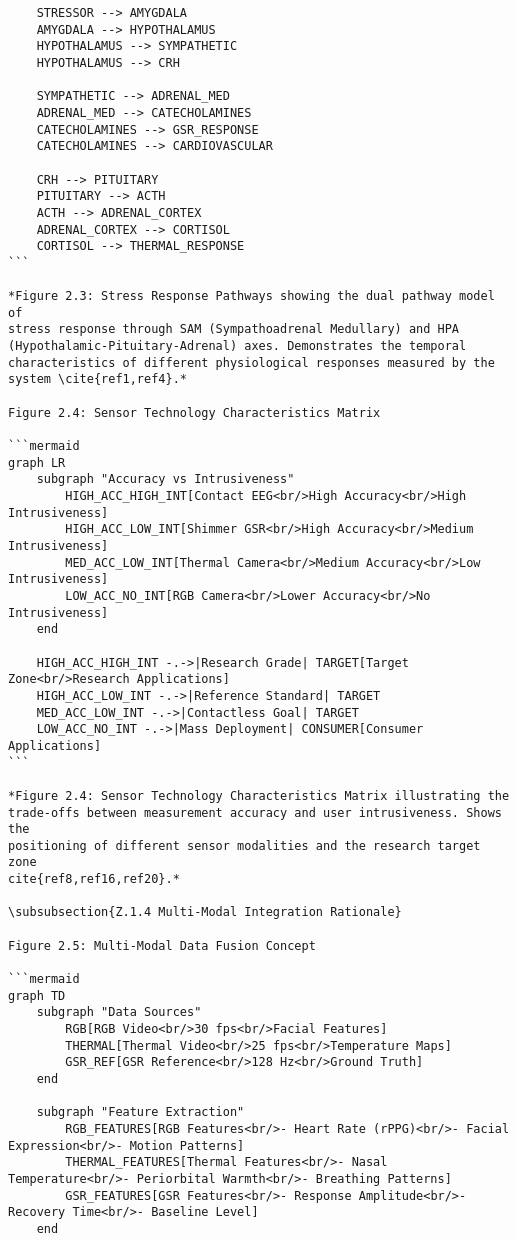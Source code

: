 \begin{verbatim}
    STRESSOR --> AMYGDALA
    AMYGDALA --> HYPOTHALAMUS
    HYPOTHALAMUS --> SYMPATHETIC
    HYPOTHALAMUS --> CRH

    SYMPATHETIC --> ADRENAL_MED
    ADRENAL_MED --> CATECHOLAMINES
    CATECHOLAMINES --> GSR_RESPONSE
    CATECHOLAMINES --> CARDIOVASCULAR

    CRH --> PITUITARY
    PITUITARY --> ACTH
    ACTH --> ADRENAL_CORTEX
    ADRENAL_CORTEX --> CORTISOL
    CORTISOL --> THERMAL_RESPONSE
```

*Figure 2.3: Stress Response Pathways showing the dual pathway model of
stress response through SAM (Sympathoadrenal Medullary) and HPA
(Hypothalamic-Pituitary-Adrenal) axes. Demonstrates the temporal
characteristics of different physiological responses measured by the
system \cite{ref1,ref4}.*

Figure 2.4: Sensor Technology Characteristics Matrix

```mermaid
graph LR
    subgraph "Accuracy vs Intrusiveness"
        HIGH_ACC_HIGH_INT[Contact EEG<br/>High Accuracy<br/>High Intrusiveness]
        HIGH_ACC_LOW_INT[Shimmer GSR<br/>High Accuracy<br/>Medium Intrusiveness]
        MED_ACC_LOW_INT[Thermal Camera<br/>Medium Accuracy<br/>Low Intrusiveness]
        LOW_ACC_NO_INT[RGB Camera<br/>Lower Accuracy<br/>No Intrusiveness]
    end

    HIGH_ACC_HIGH_INT -.->|Research Grade| TARGET[Target Zone<br/>Research Applications]
    HIGH_ACC_LOW_INT -.->|Reference Standard| TARGET
    MED_ACC_LOW_INT -.->|Contactless Goal| TARGET
    LOW_ACC_NO_INT -.->|Mass Deployment| CONSUMER[Consumer Applications]
```

*Figure 2.4: Sensor Technology Characteristics Matrix illustrating the
trade-offs between measurement accuracy and user intrusiveness. Shows the
positioning of different sensor modalities and the research target zone
cite{ref8,ref16,ref20}.*

\subsubsection{Z.1.4 Multi-Modal Integration Rationale}

Figure 2.5: Multi-Modal Data Fusion Concept

```mermaid
graph TD
    subgraph "Data Sources"
        RGB[RGB Video<br/>30 fps<br/>Facial Features]
        THERMAL[Thermal Video<br/>25 fps<br/>Temperature Maps]
        GSR_REF[GSR Reference<br/>128 Hz<br/>Ground Truth]
    end

    subgraph "Feature Extraction"
        RGB_FEATURES[RGB Features<br/>- Heart Rate (rPPG)<br/>- Facial Expression<br/>- Motion Patterns]
        THERMAL_FEATURES[Thermal Features<br/>- Nasal Temperature<br/>- Periorbital Warmth<br/>- Breathing Patterns]
        GSR_FEATURES[GSR Features<br/>- Response Amplitude<br/>- Recovery Time<br/>- Baseline Level]
    end


\end{verbatim}
